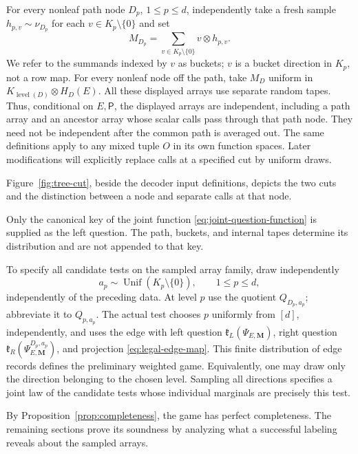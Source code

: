 For every nonleaf path node $D_p$, $1\le p\le d$, independently take a fresh sample
$h_{p,v}\sim\nu_{D_p}$ for each $v\in K_p\setminus\{0\}$ and set
\begin{equation}\label{eq:array-bucket-sampler}
 M_{D_p}=\sum_{v\in K_p\setminus\{0\}}v\otimes h_{p,v}.
\end{equation}
We refer to the summands indexed by $v$ as buckets; $v$ is a bucket
direction in $K_p$, not a row map.
For every nonleaf node off the path, take $M_D$ uniform in
$K_{\operatorname{level}(D)}\otimes H_D(E)$.
All these displayed arrays use separate random tapes.  Thus, conditional
on $E,\mathsf P$, the displayed arrays are independent, including a path
array and an ancestor array whose scalar calls pass through that path
node.  They need not be independent after the common path is averaged out.
The same definitions apply to any mixed tuple $O$ in its own function
spaces.  Later modifications will explicitly replace calls at a specified
cut by uniform draws.

Figure~\ref{fig:tree-cut}, beside the decoder input definitions, depicts the
two cuts and the distinction between a node and separate calls at that node.

Only the canonical key of the joint function
\eqref{eq:joint-question-function} is supplied as the left question.  The
path, buckets, and internal tapes determine its distribution and are not
appended to that key.

To specify all candidate tests on the sampled array family, draw independently
\[
 a_p\sim\operatorname{Unif}(K_p\setminus\{0\}),\qquad 1\leq p\leq d,
\]
independently of the preceding data.  At level $p$ use the quotient
$Q_{D_p,a_p}$; abbreviate it to $Q_{p,a_p}$.  The actual test chooses $p$
uniformly from $[d]$, independently, and uses the edge with left question
$\mathfrak k_L(\Psi_{E,\mathbf M})$, right question
$\mathfrak k_R(\Psi^{D_p,a_p}_{E,\mathbf M})$, and projection
\eqref{eq:legal-edge-map}.  This finite distribution of edge records defines
the preliminary weighted game.  Equivalently, one may draw only the direction
belonging to the chosen level.  Sampling all directions specifies a joint law
of the candidate tests whose individual marginals are precisely this test.

By Proposition~\ref{prop:completeness}, the game has perfect completeness.
The remaining sections prove its soundness by analyzing what a successful
labeling reveals about the sampled arrays.
